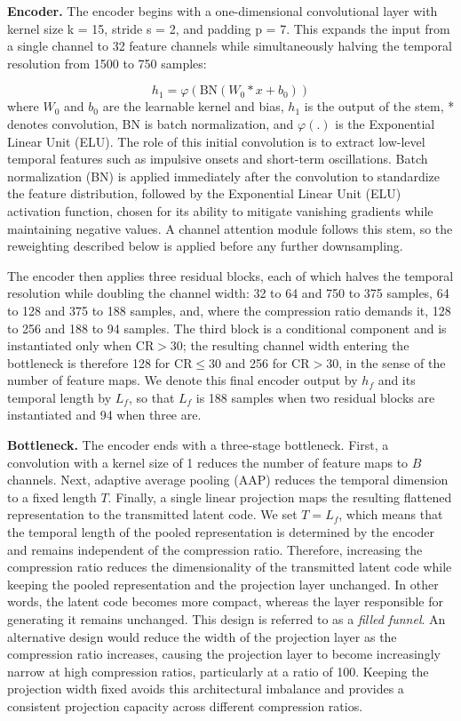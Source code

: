 \documentclass[fleqn,10pt]{wlscirep}
\begin{document}
\textbf{Encoder.} The encoder begins with a one-dimensional convolutional layer with kernel size k = 15, stride s = 2, and padding p = 7. This expands the input from a single channel to 32 feature channels while simultaneously halving the temporal resolution from 1500 to 750 samples:

\begin{equation}
h_1 = \varphi\!\left(\mathrm{BN}(W_0 \ast x + b_0)\right)
\end{equation}
where $W_0$ and $b_0$ are the learnable kernel and bias, $h_1$ is the output of the stem, * denotes convolution, BN is batch normalization, and $\varphi(.)$ is the Exponential Linear Unit (ELU). The role of this initial convolution is to extract low-level temporal features such as impulsive onsets and short-term oscillations. Batch normalization (BN) is applied immediately after the convolution to standardize the feature distribution, followed by the Exponential Linear Unit (ELU) activation function, chosen for its ability to mitigate vanishing gradients while maintaining negative values. A channel attention module follows this stem, so the reweighting described below is applied before any further downsampling.

The encoder then applies three residual blocks, each of which halves the temporal resolution while doubling the channel width: 32 to 64 and 750 to 375 samples, 64 to 128 and 375 to 188 samples, and, where the compression ratio demands it, 128 to 256 and 188 to 94 samples. The third block is a conditional component and is instantiated only when $\mathrm{CR} > 30$; the resulting channel width entering the bottleneck is therefore 128 for $\mathrm{CR} \leq 30$ and 256 for $\mathrm{CR} > 30$, in the sense of the number of feature maps. We denote this final encoder output by $h_{f}$ and its temporal length by $L_{f}$, so that $L_{f}$ is 188 samples when two residual blocks are instantiated and 94 when three are.

\textbf{Bottleneck.} The encoder ends with a three-stage bottleneck. First, a convolution with a kernel size of 1 reduces the number of feature maps to $B$ channels. Next, adaptive average pooling (AAP) \cite{lin2013network} reduces the temporal dimension to a fixed length $T$. Finally, a single linear projection maps the resulting flattened representation to the transmitted latent code. We set $T=L_f$, which means that the temporal length of the pooled representation is determined by the encoder and remains independent of the compression ratio. Therefore, increasing the compression ratio reduces the dimensionality of the transmitted latent code while keeping the pooled representation and the projection layer unchanged. In other words, the latent code becomes more compact, whereas the layer responsible for generating it remains unchanged. This design is referred to as a \emph{filled funnel}. An alternative design would reduce the width of the projection layer as the compression ratio increases, causing the projection layer to become increasingly narrow at high compression ratios, particularly at a ratio of 100. Keeping the projection width fixed avoids this architectural imbalance and provides a consistent projection capacity across different compression ratios.
\end{document}
